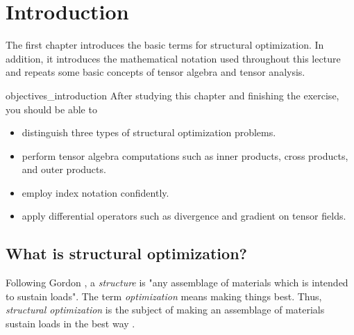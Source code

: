 \chapter{Introduction}
The first chapter introduces the basic terms for structural optimization. In addition, it introduces the mathematical notation used throughout this lecture and repeats some basic concepts of tensor algebra and tensor analysis. 

\begin{objectives}{}{objectives_introduction}
After studying this chapter and finishing the exercise, you should be able to 
\begin{itemize}[label=$\dots$]
    \item distinguish three types of structural optimization problems.
    \item perform tensor algebra computations such as inner products, cross products, and outer products.
    \item employ index notation confidently.
    \item apply differential operators such as divergence and gradient on tensor fields.
\end{itemize}
\end{objectives}


\section{What is structural optimization?}
Following Gordon \cite{Gordon2003}, a \emph{structure} is "any assemblage of materials which is intended to sustain loads". The term \emph{optimization} means making things best. Thus, \emph{structural optimization} is the subject of making an assemblage of materials sustain loads in the best way \cite{Christensen2008}. 

